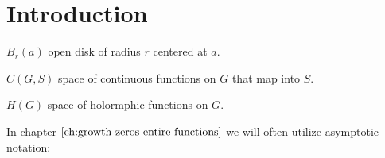\chapter{Introduction}
\label{ch:introduction}




$B_r(a)$ open disk of radius $r$ centered at $a$.

$C(G, S)$ space of continuous functions on $G$ that map into $S$.

$H(G)$ space of holormphic functions on $G$.

In chapter $\ref{ch:growth-zeros-entire-functions}$ we will often utilize asymptotic notation:

